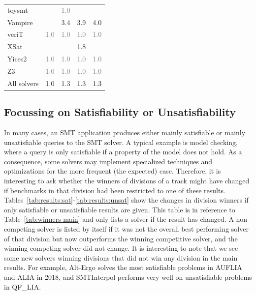 \documentclass[dvipsnames,table,twoside,11pt]{article}
\begin{document}
\begin{table}
\begin{tabular}{lrrrr}
    toysmt            &     & \textcolor{gray}{1.0} &     &     \\
    Vampire           &     & 3.4 & 3.9 & 4.0 \\
    veriT             & \textcolor{gray}{1.0} & \textcolor{gray}{1.0} & \textcolor{gray}{1.0} & \textcolor{gray}{1.0} \\
    XSat              &     &     & 1.8 &     \\
    Yices2            & \textcolor{gray}{1.0} & \textcolor{gray}{1.0} & \textcolor{gray}{1.0} & \textcolor{gray}{1.0} \\
    Z3                & \textcolor{gray}{1.0} & \textcolor{gray}{1.0} & \textcolor{gray}{1.0} & \textcolor{gray}{1.0} \\
    \midrule
    All solvers       & 1.0 & 1.3 & 1.3 & 1.3 \\
    \bottomrule
  \end{tabular}
\end{table}

\subsection{Focussing on Satisfiability or Unsatisfiability}

In many cases, an SMT application produces either mainly satisfiable or mainly
unsatisfiable queries to the SMT solver.  A typical example is model checking,
where a query is only satisfiable if a property of the model does not hold.  As
a consequence, some solvers may implement specialized techniques and
optimizations for the more frequent (the expected) case.
%
Therefore, it is interesting to ask whether the winners of divisions of a track
might have changed if benchmarks in that division had been restricted to one of
these results.  Tables~\ref{tab:results:sat}-\ref{tab:results:unsat} show the
changes in division winners if only satisfiable or unsatisfiable results are
given. This table is in reference to Table~\ref{tab:winners-main} and only
lists a solver if the result has changed. A non-competing solver is listed by
itself if it was not the overall best performing solver of that division but
now outperforms the winning competitive solver, and the winning competing
solver did not change.
It is interesting to note that we see some new solvers winning divisions that did not win any division in the main results. For example, Alt-Ergo solves the most satisfiable problems in AUFLIA and ALIA in 2018, and SMTInterpol performs very well on unsatisfiable problems in QF\_LIA.
\end{document}
